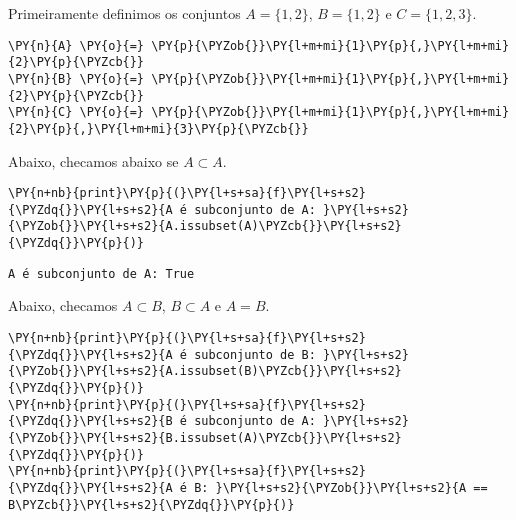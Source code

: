 \documentclass{book}
\begin{document}
        \begin{exemplo}
            Primeiramente definimos os conjuntos $A=\{1,2\}$, $B=\{1,2\}$ e $C=\{1,2,3\}$.



\begin{Verbatim}[commandchars=\\\{\},frame=single,fontsize=\small, xleftmargin=0.5em]
\PY{n}{A} \PY{o}{=} \PY{p}{\PYZob{}}\PY{l+m+mi}{1}\PY{p}{,}\PY{l+m+mi}{2}\PY{p}{\PYZcb{}}
\PY{n}{B} \PY{o}{=} \PY{p}{\PYZob{}}\PY{l+m+mi}{1}\PY{p}{,}\PY{l+m+mi}{2}\PY{p}{\PYZcb{}}
\PY{n}{C} \PY{o}{=} \PY{p}{\PYZob{}}\PY{l+m+mi}{1}\PY{p}{,}\PY{l+m+mi}{2}\PY{p}{,}\PY{l+m+mi}{3}\PY{p}{\PYZcb{}}
\end{Verbatim}


            Abaixo, checamos abaixo se $A \subset A$.




\begin{Verbatim}[commandchars=\\\{\},frame=single,fontsize=\small, xleftmargin=0.5em]
\PY{n+nb}{print}\PY{p}{(}\PY{l+s+sa}{f}\PY{l+s+s2}{\PYZdq{}}\PY{l+s+s2}{A é subconjunto de A: }\PY{l+s+s2}{\PYZob{}}\PY{l+s+s2}{A.issubset(A)\PYZcb{}}\PY{l+s+s2}{\PYZdq{}}\PY{p}{)}
\end{Verbatim}

\begin{Verbatim}[commandchars=\\\{\},frame=leftline,fontsize=\small, xleftmargin=0.5em]
A é subconjunto de A: True
\end{Verbatim}


            Abaixo, checamos $A \subset B$, $B \subset A$ e $A = B$.



\begin{Verbatim}[commandchars=\\\{\},frame=single,fontsize=\small, xleftmargin=0.5em]
\PY{n+nb}{print}\PY{p}{(}\PY{l+s+sa}{f}\PY{l+s+s2}{\PYZdq{}}\PY{l+s+s2}{A é subconjunto de B: }\PY{l+s+s2}{\PYZob{}}\PY{l+s+s2}{A.issubset(B)\PYZcb{}}\PY{l+s+s2}{\PYZdq{}}\PY{p}{)}
\PY{n+nb}{print}\PY{p}{(}\PY{l+s+sa}{f}\PY{l+s+s2}{\PYZdq{}}\PY{l+s+s2}{B é subconjunto de A: }\PY{l+s+s2}{\PYZob{}}\PY{l+s+s2}{B.issubset(A)\PYZcb{}}\PY{l+s+s2}{\PYZdq{}}\PY{p}{)}
\PY{n+nb}{print}\PY{p}{(}\PY{l+s+sa}{f}\PY{l+s+s2}{\PYZdq{}}\PY{l+s+s2}{A é B: }\PY{l+s+s2}{\PYZob{}}\PY{l+s+s2}{A == B\PYZcb{}}\PY{l+s+s2}{\PYZdq{}}\PY{p}{)}
\end{Verbatim}


\end{exemplo}
\end{document}
